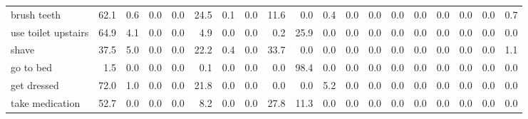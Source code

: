 \documentclass{article}
\begin{document}
\begin{sideways}
\begin{tabular}{lrrrrrrrrrrrrrrrrrr}
brush teeth                   &        62.1 &                0.6 &           0.0 &                          0.0 &               24.5 &                0.1 &                        0.0 &         11.6 &              0.0 &                0.4 &                    0.0 &                      0.0 &                  0.0 &                   0.0 &              0.0 &              0.0 &                                  0.0 &          0.7 \\
use toilet upstairs           &        64.9 &                4.1 &           0.0 &                          0.0 &                4.9 &                0.0 &                        0.0 &          0.2 &             25.9 &                0.0 &                    0.0 &                      0.0 &                  0.0 &                   0.0 &              0.0 &              0.0 &                                  0.0 &          0.0 \\
shave                         &        37.5 &                5.0 &           0.0 &                          0.0 &               22.2 &                0.4 &                        0.0 &         33.7 &              0.0 &                0.0 &                    0.0 &                      0.0 &                  0.0 &                   0.0 &              0.0 &              0.0 &                                  0.0 &          1.1 \\
go to bed                     &         1.5 &                0.0 &           0.0 &                          0.0 &                0.1 &                0.0 &                        0.0 &          0.0 &             98.4 &                0.0 &                    0.0 &                      0.0 &                  0.0 &                   0.0 &              0.0 &              0.0 &                                  0.0 &          0.0 \\
get dressed                   &        72.0 &                1.0 &           0.0 &                          0.0 &               21.8 &                0.0 &                        0.0 &          0.0 &              0.0 &                5.2 &                    0.0 &                      0.0 &                  0.0 &                   0.0 &              0.0 &              0.0 &                                  0.0 &          0.0 \\
take medication               &        52.7 &                0.0 &           0.0 &                          0.0 &                8.2 &                0.0 &                        0.0 &         27.8 &             11.3 &                0.0 &                    0.0 &                      0.0 &                  0.0 &                   0.0 &              0.0 &              0.0 &                                  0.0 &          0.0 \\

\end{tabular}
\end{sideways}
\end{document}
